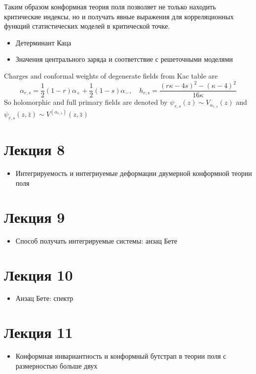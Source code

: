 \documentclass[a4paper,12pt]{article} \usepackage[utf8x]{inputenc} \usepackage[russian]{babel}
\theoremstyle{definition} \newtheorem{corollary}{Corollary}[theorem] \theoremstyle{definition}
\begin{document}
Таким образом конформная теория поля позволяет не только находить критические индексы, но и получать
явные выражения для корреляционных функций статистических моделей в критической точке.



  \begin{itemize}
  \item Детерминант Каца
  \item Значения центрального заряда и соответствие с решеточными моделями
  \end{itemize}

Charges and conformal weights of degenerate fields from Kac table are
\begin{equation}
  \label{eq:139} \alpha_{r,s}=\frac{1}{2}(1-r)\alpha_{+}+\frac{1}{2}(1-s)\alpha_{-},\quad
h_{r,s}=\frac{(r\kappa-4s)^{2}-(\kappa-4)^{2}}{16\kappa}
\end{equation} So holomorphic and full primary fields are denoted by $\psi_{r,s}(z)\sim
V_{\alpha_{r,s}}(z)$ and $\psi_{r,s}(z,\bar z)\sim V^{(\alpha_{r,s})}(z,\bar z)$

\section{Лекция 8}
\label{sec:-8}

  \begin{itemize}
  \item Интегрируемость и интегриуемые деформации двумерной конформной теории поля
  \end{itemize}

\section{Лекция 9}
  \begin{itemize}
  \item Способ получать интегрируемые системы: анзац Бете
  \end{itemize}
\section{Лекция 10}
  \begin{itemize}
  \item Анзац Бете: спектр
  \end{itemize}

\section{Лекция 11}
  \begin{itemize}
  \item Конформная инвариантность и конформный бутстрап в теории поля с размерностью больше двух
  \end{itemize}
\end{document}
